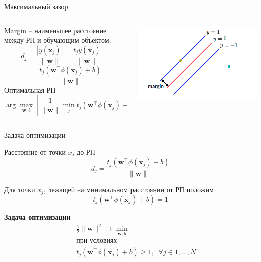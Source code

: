 \documentclass[10pt,a4paper]{beamer}
\begin{document}

\begin{frame}{Максимальный зазор}

\begin{columns}[T]
    \begin{column}{.51\textwidth}
    Margin -- наименьшее расстояние между РП и обучающим объектом.
    \[
    d_j = \frac{|y(\mathbf{x}_j)|}{\|\mathbf{w}\|} = \frac{t_j y(\mathbf{x}_j)}{\|\mathbf{w}\|} = 
    \]    
    \[
    = \frac{t_j (\mathbf{w}^\top \phi(\mathbf{x}_j) + b)}{\|\mathbf{w}\|}
    \]
    Оптимальная РП
    \[
    \arg \max_{\mathbf{w}, b} \left[\frac{1}{\|\mathbf{w}\|} \min_j t_j (\mathbf{w}^\top \phi(\mathbf{x}_j) + b) \right]
    \]
	
    \end{column}
       
    \begin{column}{.5\textwidth}
    \vspace{-0em}
	\begin{center}
   		\includegraphics[scale=0.45]{images/margin.png}
    \end{center}
    \end{column}
  \end{columns}
  
\end{frame}


\begin{frame}{Задача оптимизации}

Расстояние от точки $x_j$ до РП
\[
d_j = \frac{t_j (\mathbf{w}^\top \phi(\mathbf{x}_j) + b)}{\|\mathbf{w}\|}
\]

Для точки $x_j$, лежащей на минимальном расстоянии от РП положим
\[
t_j (\mathbf{w}^\top \phi(\mathbf{x}_j) + b) = 1
\]

\begin{framed}
{\bf Задача оптимизации}
\begin{eqnarray*}
&& \frac 1 2 \|\mathbf{w}\|^2 \rightarrow \min_{\mathbf{w}, b} \\
&& \text{при условиях} \\
&& t_j (\mathbf{w}^\top \phi(\mathbf{x}_j) + b) \geq 1, \;\; \forall j \in 1,\ldots,N
\end{eqnarray*}
\end{framed}

\end{frame}
\end{document}
